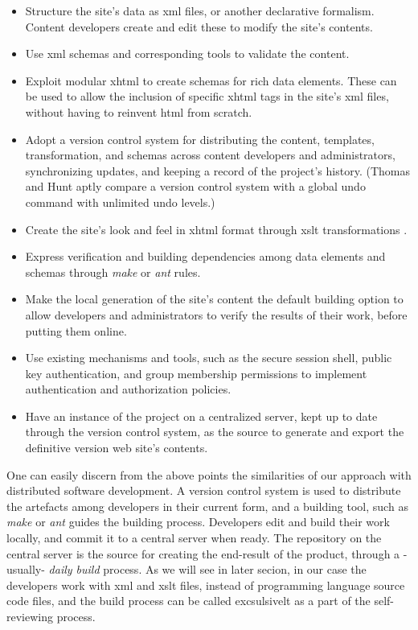 \documentclass[10pt]{article}
\begin{document}
\begin{itemize}
\item Structure the site's data as {\sc xml} files,
or another declarative formalism.
Content developers create and edit these to modify the site's contents.
\item Use {\sc xml} schemas and corresponding tools to validate the content.
\item Exploit modular {\sc xhtml} \cite{W3C_MODULAR_XHTML} to create schemas for rich
data elements.
These can be used to allow the inclusion of specific {\sc xhtml} tags
in the site's {\sc xml} files, without having to reinvent {\sc html}
from scratch.
\item Adopt a version control system for distributing the content,
templates, transformation, and schemas across content developers and
administrators, synchronizing updates, and keeping a record of the project's history.
(Thomas and Hunt \cite{HT00} aptly compare a version control system
with a global undo command with unlimited undo levels.)
\item Create the site's look and feel in {\sc xhtml} format
through {\sc xslt}  transformations \cite{HM01}.
\item Express verification and building dependencies among
data elements and schemas through {\em make} \cite{MAKE} or {\em ant}
\cite{JAKARTA_ANT} rules.
\item Make the local generation of the site's content the default
building option to allow developers and administrators to verify
the results of  their work, before putting them online.
\item Use existing mechanisms and tools, such as the secure session shell,
public key authentication, and group membership permissions to implement
authentication and authorization policies.
\item Have an instance of the project on a centralized server, kept up to
date through the version control system, as the source to generate and export
the definitive version web site's contents.
\end{itemize}

One can easily discern from the above points the similarities of our
approach with distributed software development.
A version control system is used to distribute the artefacts among
developers in their current form, and a building tool, such as {\em make}
or {\em ant} guides the building process.
Developers edit and build their work locally, and commit it to a central server when ready.
The repository on the central server is the source for creating the end-result
of the product, through a -usually- {\em daily build} process.
As we will see in later secion, in our case the developers work with {\sc xml} and {\sc xslt}
files, instead of programming language source code files, and the {\sc build} process can be called excsulsivelt as a part of
the self-reviewing process.
\end{document}
